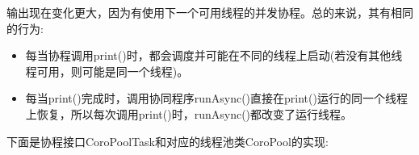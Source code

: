输出现在变化更大，因为有使用下一个可用线程的并发协程。总的来说，其有相同的行为:

\begin{itemize}
\item
每当协程调用print()时，都会调度并可能在不同的线程上启动(若没有其他线程可用，则可能是同一个线程)。

\item
每当print()完成时，调用协同程序runAsync()直接在print()运行的同一个线程上恢复，所以每次调用print()时，runAsync()都改变了运行线程。
\end{itemize}


下面是协程接口CoroPoolTask和对应的线程池类CoroPool的实现:


